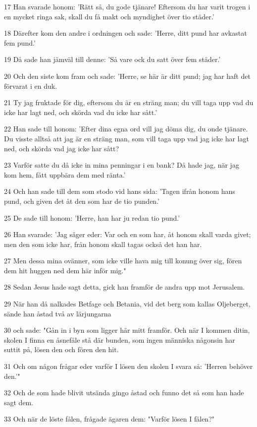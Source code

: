 \par 17 Han svarade honom: 'Rätt så, du gode tjänare! Eftersom du har varit trogen i en mycket ringa sak, skall du få makt och myndighet över tio städer.'
\par 18 Därefter kom den andre i ordningen och sade: 'Herre, ditt pund har avkastat fem pund.'
\par 19 Då sade han jämväl till denne: 'Så vare ock du satt över fem städer.'
\par 20 Och den siste kom fram och sade: 'Herre, se här är ditt pund; jag har haft det förvarat i en duk.
\par 21 Ty jag fruktade för dig, eftersom du är en sträng man; du vill taga upp vad du icke har lagt ned, och skörda vad du icke har sått.'
\par 22 Han sade till honom: 'Efter dina egna ord vill jag döma dig, du onde tjänare. Du visste alltså att jag är en sträng man, som vill taga upp vad jag icke har lagt ned, och skörda vad jag icke har sått?
\par 23 Varför satte du då icke in mina penningar i en bank? Då hade jag, när jag kom hem, fått uppbära dem med ränta.'
\par 24 Och han sade till dem som stodo vid hans sida: 'Tagen ifrån honom hans pund, och given det åt den som har de tio punden.'
\par 25 De sade till honom: 'Herre, han har ju redan tio pund.'
\par 26 Han svarade: 'Jag säger eder: Var och en som har, åt honom skall varda givet; men den som icke har, från honom skall tagas också det han har.
\par 27 Men dessa mina ovänner, som icke ville hava mig till konung över sig, fören dem hit huggen ned dem här inför mig."
\par 28 Sedan Jesus hade sagt detta, gick han framför de andra upp mot Jerusalem.
\par 29 När han då nalkades Betfage och Betania, vid det berg som kallas Oljeberget, sände han åstad två av lärjungarna
\par 30 och sade: "Gån in i byn som ligger här mitt framför. Och när I kommen ditin, skolen I finna en åsnefåle stå där bunden, som ingen människa någonsin har suttit på, lösen den och fören den hit.
\par 31 Och om någon frågar eder varför I lösen den skolen I svara så: 'Herren behöver den.'"
\par 32 Och de som hade blivit utsända gingo åstad och funno det så som han hade sagt dem.
\par 33 Och när de löste fålen, frågade ägaren dem: "Varför lösen I fålen?"
